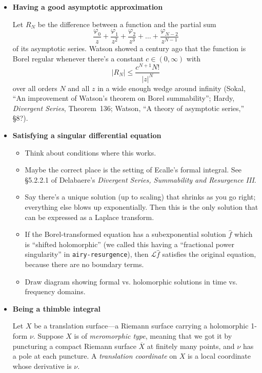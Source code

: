 \documentclass{article}
\newcommand{\laplace}{\mathcal{L}}
\begin{document}
\begin{itemize}
\item \textbf{Having a good asymptotic approximation}

Let $R_N$ be the difference between a function and the partial sum
\[ \frac{\varphi_0}{z} + \frac{\varphi_1}{z^2} + \frac{\varphi_2}{z^3} + \ldots + \frac{\varphi_{N-2}}{z^{N-1}} \]
of its asymptotic series. Watson showed a century ago that the function is Borel regular whenever there's a constant $c \in (0, \infty)$ with
\[ |R_N| \le \frac{c^{N+1} N!}{|z|^N} \]
over all orders $N$ and all $z$ in a wide enough wedge around infinity (Sokal, ``An improvement of Watson's theorem on Borel summability''; Hardy, {\em Divergent Series}, Theorem~136; Watson, ``A theory of asymptotic series,'' \S 8?).
\item \textbf{Satisfying a singular differential equation}

\begin{itemize}
\item Think about conditions where this works.
\item Maybe the correct place is the setting of Ecalle's formal integral. See \S 5.2.2.1 of Delabaere's {\em Divergent Series, Summability and Resurgence III}.
\item Say there's a unique solution (up to scaling) that shrinks as you go right; everything else blows up exponentially. Then this is the only solution that can be expressed as a Laplace transform.
\item If the Borel-transformed equation has a subexponential solution $\hat{f}$ which is ``shifted holomorphic'' (we called this having a ``fractional power singularity'' in {\tt airy-resurgence}), then $\laplace \hat{f}$ satisfies the original equation, because there are no boundary terms.
\item Draw diagram showing formal vs. holomorphic solutions in time vs. frequency domains.
\end{itemize}
\item \textbf{Being a thimble integral}

Let $X$ be a translation surface---a Riemann surface carrying a holomorphic 1-form $\nu$. Suppose $X$ is of {\em meromorphic type}, meaning that we got it by puncturing a compact Riemann surface $\overline{X}$ at finitely many points, and $\nu$ has a pole at each puncture. A {\em translation coordinate} on $X$ is a local coordinate whose derivative is $\nu$.


\end{itemize}
\end{document}
